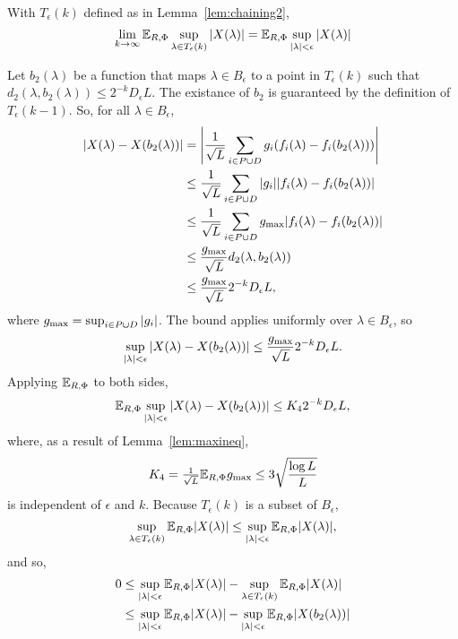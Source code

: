 \documentclass[journal]{IEEEtran}
\begin{document}
\begin{lemma}\label{lem:limexpTk} With $T_\epsilon(k)$ defined as in Lemma~\ref{lem:chaining2},
\[
\lim_{k\rightarrow\infty}{\mathbb E}_{R,\Phi}\sup_{\lambda \in T_\epsilon(k)} {\vert X(\lambda) \vert} = {\mathbb E}_{R,\Phi} \sup_{{\vert \lambda \vert} < \epsilon} {\vert X(\lambda) \vert}
\]
\end{lemma}
\begin{IEEEproof}
Let $b_2(\lambda)$ be a function that maps $\lambda \in B_\epsilon$ to a point in $T_\epsilon(k)$ such that  $d_2(\lambda,b_2(\lambda)) \leq 2^{-k}D_\epsilon L$.  The existance of $b_2$ is guaranteed by the definition of $T_\epsilon(k-1)$.  So, for all $\lambda \in B_\epsilon$,
\begin{align*}
{\vert X(\lambda) - X(b_2(\lambda)) \vert} &= {\left\vert \frac{1}{\sqrt{L}}\sum_{i\in P \cup D}g_i(f_i(\lambda) - f_i(b_2(\lambda))) \right\vert} \\
&\leq  \frac{1}{\sqrt{L}}\sum_{i\in P \cup D}{\left\vert g_i \right\vert}{\vert f_i(\lambda) - f_i(b_2(\lambda)) \vert} \\
&\leq \frac{1}{\sqrt{L}} \sum_{i\in P \cup D} g_\text{max} {\vert f_i(\lambda) - f_i(b_2(\lambda)) \vert} \\
&\leq \frac{g_\text{max}}{\sqrt{L}} d_2(\lambda,b_2(\lambda)) \\
&\leq \frac{g_\text{max}}{\sqrt{L}} 2^{-k} D_\epsilon L,
\end{align*}
where $g_\text{max} = \sup_{i\in P\cup D} {\left\vert g_i \right\vert}$. The bound applies uniformly over $\lambda \in B_\epsilon$, so
\[
\sup_{{\vert \lambda \vert} < \epsilon} {\vert X(\lambda) - X(b_2(\lambda)) \vert} \leq \frac{g_\text{max}}{\sqrt{L}} 2^{-k} D_\epsilon L.
\]
Applying ${\mathbb E}_{R,\Phi}$ to both sides,
\[
{\mathbb E}_{R,\Phi} \sup_{{\vert \lambda \vert} < \epsilon} {\vert X(\lambda) - X(b_2(\lambda)) \vert} \leq K_4 2^{-k} D_\epsilon L,
\]
where, as a result of Lemma~\ref{lem:maxineq},
\[
K_4 = \tfrac{1}{\sqrt{L}}{\mathbb E}_{R,\Phi} g_\text{max} \leq 3 \sqrt{\frac{\log L}{L}}
\]
is independent of $\epsilon$ and $k$.  Because $T_\epsilon(k)$ is a subset of $B_\epsilon$,
\[
\sup_{\lambda \in T_\epsilon(k)} {\mathbb E}_{R,\Phi} {\vert X(\lambda) \vert} \leq \sup_{{\vert \lambda \vert} < \epsilon} {\mathbb E}_{R,\Phi} {\vert X(\lambda) \vert},
\]
and so,
\begin{align*}
0 &\leq \sup_{\sabs{\lambda} < \epsilon} \expect_{R,\Phi} \sabs{X(\lambda)} - \sup_{\lambda \in T_\epsilon(k)} \expect_{R,\Phi} \sabs{X(\lambda)} \nonumber \\
&\leq \sup_{\sabs{\lambda} < \epsilon} \expect_{R,\Phi} \sabs{X(\lambda)} - \sup_{\sabs{\lambda} < \epsilon} \expect_{R,\Phi} \sabs{X(b_2(\lambda))} \nonumber \\

\end{align*}
\end{IEEEproof}
\end{document}
